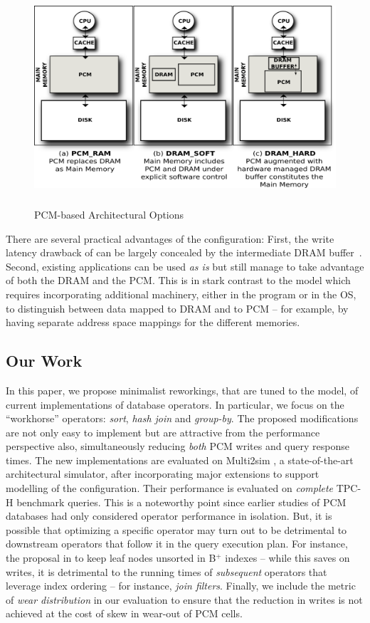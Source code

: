 \begin{figure}[t]
	\includegraphics[height=80mm]{./fig/PCM_Models.png}\centering
	\caption{PCM-based Architectural Options \cite{chen}}
	\label{fig:pcm_models}
\end{figure}

There are several practical advantages of the \model{} configuration:
First, the write latency drawback of \modelPcmRam{} can be largely
concealed by the intermediate DRAM buffer~\cite{qureshi}. Second,
existing applications can be used \textit{as is} but still manage to take
advantage of both the DRAM and the PCM. This is in stark contrast to the
\modelExplicit{} model which requires incorporating additional machinery,
either in the program or in the OS, to distinguish between data mapped
to DRAM and to PCM -- for example, by having separate address space
mappings for the different memories.

\subsection*{Our Work}
In this paper, we propose minimalist reworkings, that are tuned to
the \model{} model,  of current implementations of database operators.
In particular, we focus on the ``workhorse'' operators:
\textit{sort}, \textit{hash join} and \textit{group-by}.
The proposed modifications are not only easy to implement but are attractive from the performance perspective also, simultaneously reducing
\emph{both} PCM writes and query response times.
The new implementations are evaluated on Multi2sim
\cite{multi2sim}, a state-of-the-art architectural simulator, after
incorporating major extensions to support modelling of the \model{}
configuration.  Their performance is evaluated on \emph{complete}
TPC-H benchmark queries. This is a noteworthy point since earlier studies
of PCM databases had only considered operator performance in isolation.
But, it is possible that optimizing a specific operator may turn out to be detrimental
to downstream operators that follow it in the query execution plan. For
instance, the proposal in \cite{chen} to keep leaf nodes unsorted in B$^+$
indexes -- while this saves on writes, it is detrimental to the running
times of \emph{subsequent} operators that leverage index ordering -- for instance, \emph{join filters}.
Finally, we include the metric of \emph{wear distribution}
in our evaluation to ensure that the reduction in writes is not achieved
at the cost of skew in wear-out of PCM cells.

